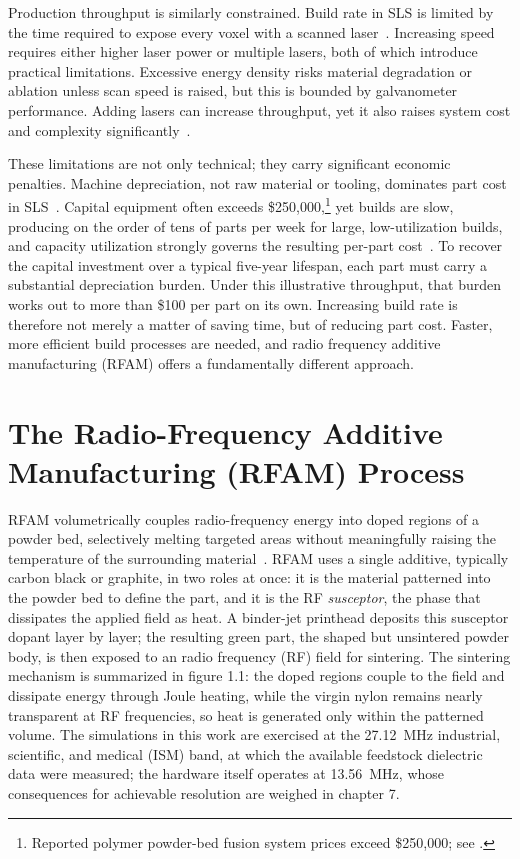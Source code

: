 Production throughput is similarly constrained. Build rate in SLS is limited
by the time required to expose every voxel with a scanned
laser~\cite{deckard1995improved}. Increasing speed requires either higher laser
power or multiple lasers, both of which introduce practical limitations. Excessive
energy density risks material degradation or ablation unless scan speed is raised,
but this is bounded by galvanometer performance. Adding lasers can increase
throughput, yet it also raises system cost and complexity
significantly~\cite{bourell2014performance,xiao2024sls}.

These limitations are not only technical; they carry significant economic
penalties. Machine depreciation, not raw material or tooling, dominates part cost
in SLS~\cite{lindemann2012lifecyclecosts,rickenbacher2013slmcostmodel}.
Capital equipment often exceeds
\$250{,}000,\footnote{Reported polymer powder-bed fusion system prices exceed
\$250{,}000; see \textcite{khajavi2014spareparts}.} yet builds are slow, producing
on the order of tens of parts per week for large, low-utilization builds, and
capacity utilization strongly governs the resulting per-part
cost~\cite{baumers2011capacityutilization}. To recover the capital
investment over a typical five-year lifespan, each part must carry a substantial
depreciation burden. Under this illustrative throughput, that burden works out to
more than \$100 per part on its own. Increasing build
rate is therefore not merely a matter of saving time, but of reducing part cost.
Faster, more efficient build processes are needed, and radio frequency additive manufacturing (RFAM) offers a
fundamentally different approach.

\section{The Radio-Frequency Additive Manufacturing (RFAM) Process}
\label{sec:intro_rfam}

RFAM volumetrically couples radio-frequency energy into doped regions of a
powder bed, selectively melting targeted areas without meaningfully raising the
temperature of the surrounding
material~\cite{allisonDissertation,allison2022volumetric,allison2022computational}.
RFAM uses a single additive, typically carbon black or graphite, in two roles at
once: it is the material patterned into the powder bed to define the part, and it is the
RF \emph{susceptor}, the phase that dissipates the applied field as heat. A binder-jet printhead deposits this susceptor
dopant layer by layer; the
resulting green part, the shaped but unsintered powder body, is then exposed to an radio frequency (RF) field for sintering. The
sintering mechanism is summarized in figure 1.1: the doped regions
couple to the field and dissipate energy through Joule heating, while the virgin
nylon remains nearly transparent at RF frequencies, so heat is generated only
within the patterned volume. The simulations in this work are exercised at the \SI{27.12}{\mega\hertz}
industrial, scientific, and medical (ISM) band, at which the available feedstock dielectric
data were measured; the hardware itself operates at \SI{13.56}{\mega\hertz}, whose
consequences for achievable resolution are weighed in chapter 7.

